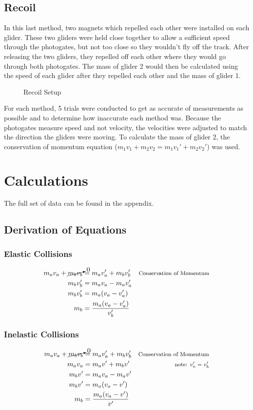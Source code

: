 \documentclass[12pt]{article}
\begin{document}
\subsection{Recoil}
In this last method, two magnets which repelled each other were installed on each glider. These two gliders were held close together to allow a sufficient speed through the photogates, but not too close so they wouldn't fly off the track. After releasing the two gliders, they repelled off each other where they would go through both photogates. The mass of glider 2 would then be calculated using the speed of each glider after they repelled each other and the mass of glider 1.
\begin{figure}[H]
	\centering
	\caption{Recoil Setup}
\end{figure}
For each method, 5 trials were conducted to get as accurate of measurements as possible and to determine how inaccurate each method was. Because the photogates measure speed and not velocity, the velocities were adjusted to match the direction the gliders were moving. To calculate the mass of glider 2, the conservation of momentum equation ($m_1v_1+m_2v_2=m_1v_1'+m_2v_2'$) was used.

\newpage
\section{Calculations}
The full set of data can be found in the appendix.
\subsection{Derivation of Equations}
\subsubsection{Elastic Collisions}
\begin{equation}
    \begin{aligned}
        m_av_a+\cancelto{0}{m_bv_b}&=m_av_a'+m_bv_b' & \text{\footnotesize{Conservation of Momentum}}\\
		m_bv_b' & =m_av_a-m_av_a'             \\
		m_bv_b' & =m_a(v_a-v_a')              \\
		m_b     & =\frac{m_a(v_a-v_a')}{v_b'} 
	\end{aligned}
\end{equation}
\subsubsection{Inelastic Collisions}
\begin{equation}
	\begin{aligned}
		m_av_a+\cancelto{0}{m_bv_b} & =m_av_a'+m_bv_b' & \text{\footnotesize{Conservation of Momentum}} \\
		m_av_a                      & =m_av'+m_bv'     & \text{\footnotesize note: $v_a'=v_b'$}         \\
		m_bv'&=m_av_a-m_av' \\
		m_bv'&=m_a(v_a-v') \\
		m_b&=\frac{m_a(v_a-v')}{v'}
	\end{aligned}
\end{equation}
\end{document}
